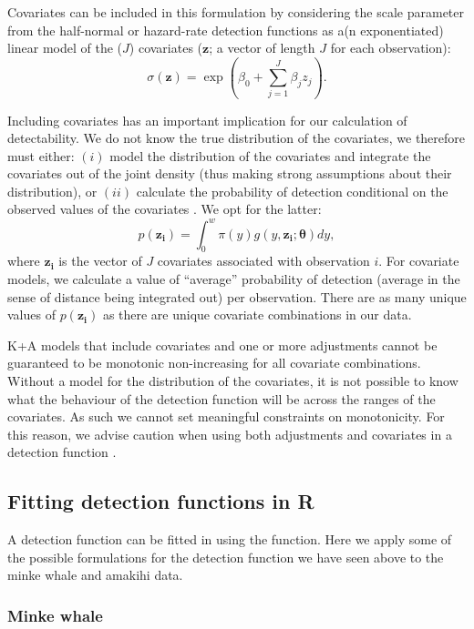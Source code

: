 \documentclass[article]{jss}
\begin{document}
Covariates can be included in this formulation by considering the scale
parameter from the half-normal or hazard-rate detection functions as a(n
exponentiated) linear model of the (\(J\)) covariates (\(\mathbf{z}\); a
vector of length \(J\) for each observation): \[
\sigma(\mathbf{z}) = \exp(\beta_0 + \sum_{j=1}^J \beta_j z_j).
\]

Including covariates has an important implication for our calculation of
detectability. We do not know the true distribution of the covariates,
we therefore must either: \((i)\) model the distribution of the
covariates and integrate the covariates out of the joint density (thus
making strong assumptions about their distribution), or \((ii)\)
calculate the probability of detection conditional on the observed
values of the covariates \citep{Marques:2003vb}. We opt for the latter:
\[
p(\mathbf{z_i}) = \int_0^w \pi(y) g(y, \mathbf{z_i}; \boldsymbol{\theta}) dy,
\] where \(\mathbf{z_i}\) is the vector of \(J\) covariates associated
with observation \(i\). For covariate models, we calculate a value of
``average'' probability of detection (average in the sense of distance
being integrated out) per observation. There are as many unique values
of \(p(\mathbf{z_i})\) as there are unique covariate combinations in our
data.

K+A models that include covariates and one or more adjustments cannot be
guaranteed to be monotonic non-increasing for all covariate
combinations. Without a model for the distribution of the covariates, it
is not possible to know what the behaviour of the detection function
will be across the ranges of the covariates. As such we cannot set
meaningful constraints on monotonicity. For this reason, we advise
caution when using both adjustments and covariates in a detection
function \citep[see][ for an example of when this can be
problematic]{Miller:2015hw}.

\subsection{Fitting detection functions in
R}\label{fitting-detection-functions-in-r}

A detection function can be fitted in  using the 
function. Here we apply some of the possible formulations for the
detection function we have seen above to the minke whale and amakihi
data.

\subsubsection{Minke whale}\label{minke-whale}
\end{document}
